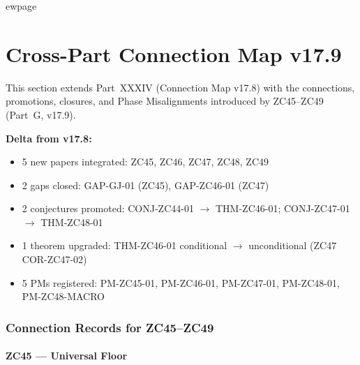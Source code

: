 \documentclass[12pt, a4paper]{article}
\begin{document}

ewpage

\part{Cross-Part Connection Map v17.9}
\label{part:xxxvii}

\begin{keybox}[title={Cross-Part Connection Map v17.9 --- Overview}]
This section extends Part~XXXIV (Connection Map v17.8) with the
connections, promotions, closures, and Phase Misalignments introduced
by ZC45--ZC49 (Part~G, v17.9).

\textbf{Delta from v17.8:}
\begin{itemize}[leftmargin=1.5em]
\item 5 new papers integrated: ZC45, ZC46, ZC47, ZC48, ZC49
\item 2 gaps closed: GAP-GJ-01 (ZC45), GAP-ZC46-01 (ZC47)
\item 2 conjectures promoted: CONJ-ZC44-01 $\to$ THM-ZC46-01;
  CONJ-ZC47-01 $\to$ THM-ZC48-01
\item 1 theorem upgraded: THM-ZC46-01 conditional $\to$ unconditional
  (ZC47 COR-ZC47-02)
\item 5 PMs registered: PM-ZC45-01, PM-ZC46-01, PM-ZC47-01,
  PM-ZC48-01, PM-ZC48-MACRO
\end{itemize}
\end{keybox}

\section{Connection Records for ZC45--ZC49}
\label{sec:connection-map-v179}

\subsection{ZC45 --- Universal Floor}
\end{document}
